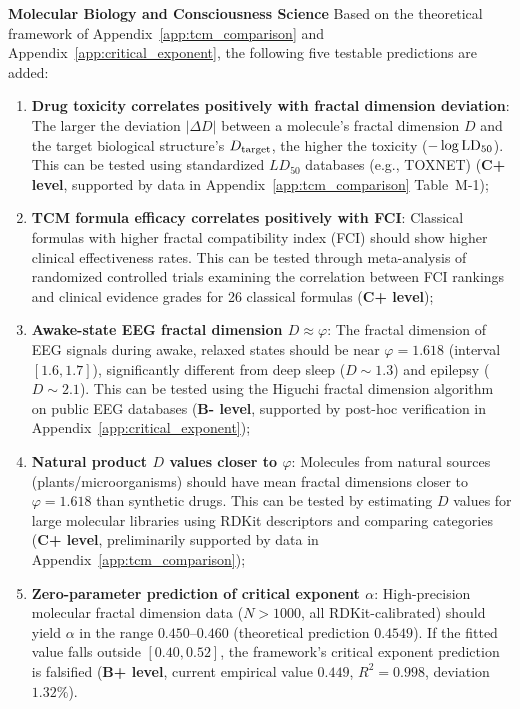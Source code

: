 \documentclass[12pt,a4paper,twocolumn]{article}
\renewcommand{\phi}{\varphi}
\begin{document}
\textbf{Molecular Biology and Consciousness Science}
Based on the theoretical framework of Appendix~\ref{app:tcm_comparison} and Appendix~\ref{app:critical_exponent}, the following five testable predictions are added:
\begin{enumerate}
\item \textbf{Drug toxicity correlates positively with fractal dimension deviation}: The larger the deviation $|\Delta D|$ between a molecule's fractal dimension $D$ and the target biological structure's $D_{\rm target}$, the higher the toxicity ($-\log {\rm LD}_{50}$). This can be tested using standardized $LD_{50}$ databases (e.g., TOXNET) (\textbf{C+ level}, supported by data in Appendix~\ref{app:tcm_comparison} Table~M-1);
\item \textbf{TCM formula efficacy correlates positively with FCI}: Classical formulas with higher fractal compatibility index (FCI) should show higher clinical effectiveness rates. This can be tested through meta-analysis of randomized controlled trials examining the correlation between FCI rankings and clinical evidence grades for 26 classical formulas (\textbf{C+ level});
\item \textbf{Awake-state EEG fractal dimension $D \approx \phi$}: The fractal dimension of EEG signals during awake, relaxed states should be near $\phi = 1.618$ (interval $[1.6, 1.7]$), significantly different from deep sleep ($D \sim 1.3$) and epilepsy ($D \sim 2.1$). This can be tested using the Higuchi fractal dimension algorithm on public EEG databases (\textbf{B- level}, supported by post-hoc verification in Appendix~\ref{app:critical_exponent});
\item \textbf{Natural product $D$ values closer to $\phi$}: Molecules from natural sources (plants/microorganisms) should have mean fractal dimensions closer to $\phi = 1.618$ than synthetic drugs. This can be tested by estimating $D$ values for large molecular libraries using RDKit descriptors and comparing categories (\textbf{C+ level}, preliminarily supported by data in Appendix~\ref{app:tcm_comparison});
\item \textbf{Zero-parameter prediction of critical exponent $\alpha$}: High-precision molecular fractal dimension data ($N > 1000$, all RDKit-calibrated) should yield $\alpha$ in the range $0.450$--$0.460$ (theoretical prediction $0.4549$). If the fitted value falls outside $[0.40, 0.52]$, the framework's critical exponent prediction is falsified (\textbf{B+ level}, current empirical value $0.449$, $R^2=0.998$, deviation $1.32\%$).
\end{enumerate}
\end{document}
